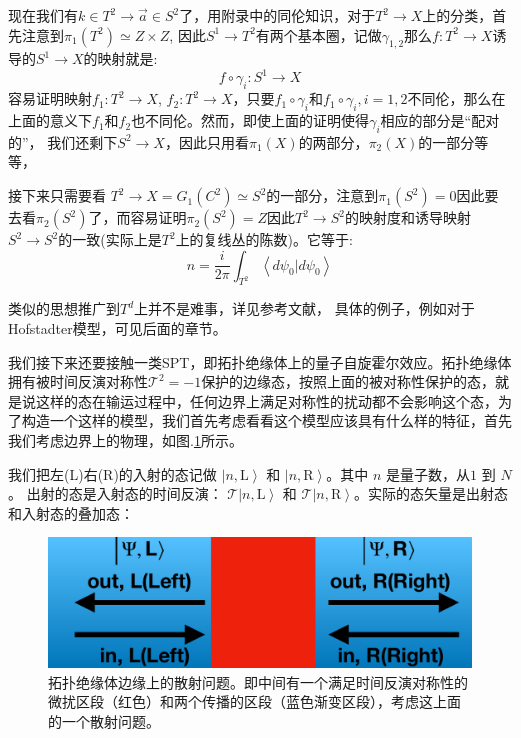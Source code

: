 \documentclass[supercite]{HustGraduPaper}
\newcommand{\bracket}[2]{\left\langle #1|#2 \right\rangle}
\begin{document}
现在我们有$k \in T^2 \to \vec{a} \in S^2$了，用附录中的同伦知识，对于$T^2 \to X$上的分类，首先注意到$\pi_1(T^2) \simeq Z \times Z$, 因此$S^1 \to T^2$有两个基本圈，记做$\gamma_{1,2}$那么$f: T^2 \to X $诱导的$S^1 \to X$的映射就是:
\begin{equation}
f \circ \gamma_i : S^1 \to X
\end{equation}
容易证明映射$f_1: T^2 \to X$, $f_2: T^2 \to X$，只要$f_1 \circ \gamma_i$和$f_1 \circ \gamma_i, i = 1,2$不同伦，那么在上面的意义下$f_1$和$f_2$也不同伦。然而，即使上面的证明使得$\gamma_i$相应的部分是“配对的”， 我们还剩下$S^2 \to X$，因此只用看$\pi_1(X)$的两部分，$\pi_2(X)$的一部分等等，

接下来只需要看
$T^2 \to X = G_1(C^2) \simeq S^2$的一部分，注意到$\pi_1(S^2) = 0$因此要去看$\pi_2(S^2)$了，而容易证明$\pi_2(S^2) = Z$因此$T^2 \to S^2$的映射度和诱导映射$S^2 \to S^2$的一致(实际上是$T^2$上的复线丛的陈数)。它等于:
\begin{equation}
n = \frac{i}{2\pi} \int_{T^2}\bracket{d\psi_0}{d\psi_0}
\end{equation}

类似的思想推广到$T^d$上并不是难事，详见参考文献\cite{avron1983homotopy}， 具体的例子，例如对于Hofstadter模型，可见后面的章节。

我们接下来还要接触一类SPT，即拓扑绝缘体上的量子自旋霍尔效应\cite{RevModPhys.83.1057,qi2010quantum,Kane2005a,sheng2006quantum,Kane2005,Wu2006,culcer2012transport}。拓扑绝缘体拥有被时间反演对称性$\mathcal{T}^2 = -1$保护的边缘态，按照上面的被对称性保护的态，就是说这样的态在输运过程中，任何边界上满足对称性的扰动都不会影响这个态，为了构造一个这样的模型\cite{hasan2011three}，我们首先考虑看看这个模型应该具有什么样的特征，首先我们考虑边界上的物理\cite{fukui2008topological}，如图.\ref{fig:scatter}所示。

我们把左(L)右(R)的入射的态记做 $\left|n,\textrm{L}\right\rangle$ 和 $\left|n,\textrm{R}\right\rangle$。其中 $n$ 是量子数，从$1$ 到 $N$。 出射的态是入射态的时间反演： $\mathcal{T}\left|n,\textrm{L}\right\rangle$ 和 $\mathcal{T}\left|n,\textrm{R}\right\rangle$。实际的态矢量是出射态和入射态的叠加态：
\begin{figure}
	\centering
	\includegraphics[width=0.7\linewidth]{Figures/scatter}
	\caption{拓扑绝缘体边缘上的散射问题。即中间有一个满足时间反演对称性的微扰区段（红色）和两个传播的区段（蓝色渐变区段），考虑这上面的一个散射问题。}
	\label{fig:scatter}
\end{figure}
\end{document}
